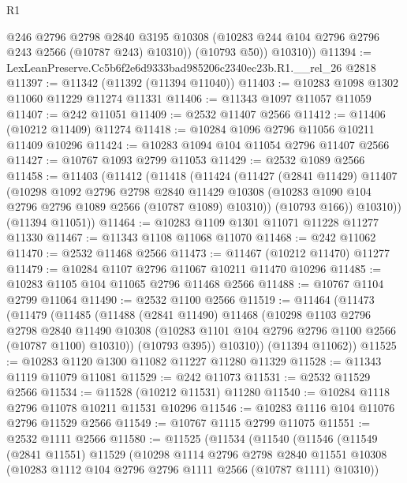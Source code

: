 \begin{lexlean}{R1}
\begin{coremodule}
            @246
            @2796
            @2798
            @2840
            @3195
            @10308
            (@10283 @244 @104 @2796 @2796 @243 @2566 (@10787 @243) @10310))
          (@10793 @50))
        @10310))
@11394 := LexLeanPreserve.Cc5b6f2e6d9333bad985206c2340ec23b.R1.__rel_26 @2818
@11397 := @11342 (@11392 (@11394 @11040))
@11403 := @10283 @1098 @1302 @11060 @11229 @11274 @11331
@11406 := @11343 @1097 @11057 @11059
@11407 := @242 @11051
@11409 := @2532 @11407 @2566
@11412 := @11406 (@10212 @11409) @11274
@11418 := @10284 @1096 @2796 @11056 @10211 @11409 @10296
@11424 := @10283 @1094 @104 @11054 @2796 @11407 @2566
@11427 := @10767 @1093 @2799 @11053
@11429 := @2532 @1089 @2566
@11458 := @11403
    (@11412
      (@11418
        (@11424
          (@11427
            (@2841 @11429)
            @11407
            (@10298
              @1092
              @2796
              @2798
              @2840
              @11429
              @10308
              (@10283 @1090 @104 @2796 @2796 @1089 @2566 (@10787 @1089) @10310))
            (@10793 @166))
          @10310))
      (@11394 @11051))
@11464 := @10283 @1109 @1301 @11071 @11228 @11277 @11330
@11467 := @11343 @1108 @11068 @11070
@11468 := @242 @11062
@11470 := @2532 @11468 @2566
@11473 := @11467 (@10212 @11470) @11277
@11479 := @10284 @1107 @2796 @11067 @10211 @11470 @10296
@11485 := @10283 @1105 @104 @11065 @2796 @11468 @2566
@11488 := @10767 @1104 @2799 @11064
@11490 := @2532 @1100 @2566
@11519 := @11464
    (@11473
      (@11479
        (@11485
          (@11488
            (@2841 @11490)
            @11468
            (@10298
              @1103
              @2796
              @2798
              @2840
              @11490
              @10308
              (@10283 @1101 @104 @2796 @2796 @1100 @2566 (@10787 @1100) @10310))
            (@10793 @395))
          @10310))
      (@11394 @11062))
@11525 := @10283 @1120 @1300 @11082 @11227 @11280 @11329
@11528 := @11343 @1119 @11079 @11081
@11529 := @242 @11073
@11531 := @2532 @11529 @2566
@11534 := @11528 (@10212 @11531) @11280
@11540 := @10284 @1118 @2796 @11078 @10211 @11531 @10296
@11546 := @10283 @1116 @104 @11076 @2796 @11529 @2566
@11549 := @10767 @1115 @2799 @11075
@11551 := @2532 @1111 @2566
@11580 := @11525
    (@11534
      (@11540
        (@11546
          (@11549
            (@2841 @11551)
            @11529
            (@10298
              @1114
              @2796
              @2798
              @2840
              @11551
              @10308
              (@10283 @1112 @104 @2796 @2796 @1111 @2566 (@10787 @1111) @10310))

\end{coremodule}
\end{lexlean}
